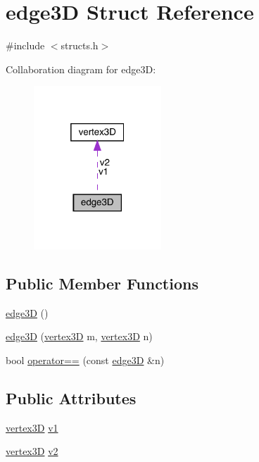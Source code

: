 \hypertarget{structedge3_d}{}\section{edge3D Struct Reference}
\label{structedge3_d}


{\ttfamily \#include $<$structs.\+h$>$}



Collaboration diagram for edge3D\+:
\nopagebreak
\begin{figure}[H]
\begin{center}
\leavevmode
\includegraphics[width=136pt]{structedge3_d__coll__graph}
\end{center}
\end{figure}
\subsection*{Public Member Functions}
\begin{DoxyCompactItemize}
\item 
\mbox{\hyperlink{structedge3_d_a91d257e72d692950510c549e26274cd4}{edge3D}} ()
\item 
\mbox{\hyperlink{structedge3_d_a56bba51f4351182ea95d186db5469671}{edge3D}} (\mbox{\hyperlink{structvertex3_d}{vertex3D}} m, \mbox{\hyperlink{structvertex3_d}{vertex3D}} n)
\item 
bool \mbox{\hyperlink{structedge3_d_a8ef491b6ec193b7fe2c9d4b5e394e964}{operator==}} (const \mbox{\hyperlink{structedge3_d}{edge3D}} \&n)
\end{DoxyCompactItemize}
\subsection*{Public Attributes}
\begin{DoxyCompactItemize}
\item 
\mbox{\hyperlink{structvertex3_d}{vertex3D}} \mbox{\hyperlink{structedge3_d_a3eff6ba2ccba4bfe780a2a7e117f7d1b}{v1}}
\item 
\mbox{\hyperlink{structvertex3_d}{vertex3D}} \mbox{\hyperlink{structedge3_d_a8ed96fe4b567f5bcb861216c96a4081b}{v2}}
\end{DoxyCompactItemize}


